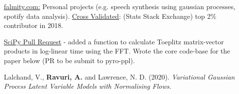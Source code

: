 

\begin{cvskills}

  {\href{https://www.falmity.com}{falmity.com:} Personal projects (e.g. speech synthesis using gaussian processes, spotify data analysis). \href{https://stats.stackexchange.com/users/211930/infprobscix}{Cross Validated}: (Stats Stack Exchange) top 2\% contributor in 2018.}

  {\href{https://github.com/scipy/scipy/pull/11346}{SciPy Pull Request} - added a function to calculate Toeplitz matrix-vector products in log-linear time using the FFT. Wrote the core code-base for the paper below (PR to be submit to pyro-ppl).}

  {Lalchand, V., \textbf{Ravuri, A.} and Lawrence, N. D. (2020). \textit{Variational Gaussian Process Latent Variable Models with Normalising Flows}.}


\end{cvskills}




